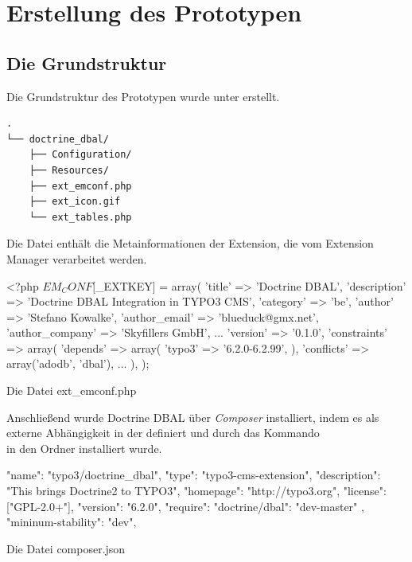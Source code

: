 \section{Erstellung des Prototypen}
\label{prototype:sec:createPrototype}

\subsection{Die Grundstruktur}
Die Grundstruktur des Prototypen wurde unter  erstellt.

\begin{Verbatim}[samepage=true]
.
└── doctrine_dbal/
    ├── Configuration/
    ├── Resources/
    ├── ext_emconf.php
    ├── ext_icon.gif
    └── ext_tables.php
\end{Verbatim}

Die Datei  enthält die Metainformationen der Extension, die vom Extension Manager verarbeitet werden.

\begin{listing}
\begin{phpcode}
<?php
$EM_CONF[$_EXTKEY] = array(
	'title' => 'Doctrine DBAL',
	'description' => 'Doctrine DBAL Integration in TYPO3 CMS',
	'category' => 'be',
	'author' => 'Stefano Kowalke',
	'author_email' => 'blueduck@gmx.net',
	'author_company' => 'Skyfillers GmbH',
	...
	'version' => '0.1.0',
	'constraints' => array(
		'depends' => array(
			'typo3' => '6.2.0-6.2.99',
		),
		'conflicts' => array('adodb', 'dbal'),
	...
	),
);
\end{phpcode}
\caption{Die Datei ext\_emconf.php}
\label{lst:extEmconf}
\end{listing}

Anschließend wurde Doctrine DBAL über \textit{Composer} installiert, indem es als externe Abhängigkeit in der  definiert und durch das Kommando\\  in den Ordner  installiert wurde.

\begin{listing}[H]
\begin{jsoncode}
{
	"name": "typo3/doctrine_dbal",
	"type": "typo3-cms-extension",
	"description": "This brings Doctrine2 to TYPO3",
	"homepage": "http://typo3.org",
	"license": ["GPL-2.0+"],
	"version": "6.2.0",
	"require": {
		"doctrine/dbal": "dev-master"
	},
	"mininum-stability": "dev",
}
\end{jsoncode}
\caption{Die Datei composer.json}
\label{lst:composer}
\end{listing}


